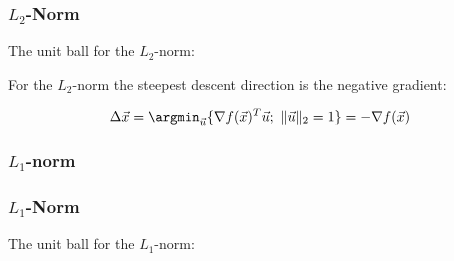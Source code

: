 \begin{frame}
  \frametitle{$L_2$-Norm}

  The unit ball for the $L_2$-norm:

  \begin{figure}
  \end{figure}
 
  For the $L_2$-norm the steepest descent direction is the negative gradient:
  
  \begin{displaymath}
    \Delta \vec x 
    = \argmin_{\vec u} \{\nabla f(\vec x)^T \vec u ; \ \| \vec u\|_2 = 1\}
    = -\nabla f(\vec x)
  \end{displaymath}
\end{frame}


\subsubsection{$L_1$-norm}

\begin{frame}
 \frametitle{$L_1$-Norm}
 
  The unit ball for the $L_1$-norm: \\[.25cm]
  
  \begin{columns}
  
      \centering
    
        \centering
        \resizebox{.9\linewidth}{!}{
          
        }
  \end{columns}
\end{frame}


